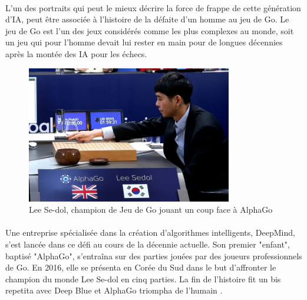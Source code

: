 \documentclass[10pt, french, a4paper]{article}
\begin{document}
\paragraph{}
L’un des portraits qui peut le mieux décrire la force de frappe de cette génération d’IA, peut être associée à l’histoire de la défaite d’un homme au jeu de Go. Le jeu de Go est l’un des jeux considérés comme les plus complexes au monde, soit un jeu qui pour l’homme devait lui rester en main pour de longues décennies après la montée des IA pour les échecs.


\begin{figure}[hbt!]
    \centering
    \includegraphics[width=0.8\textwidth]{images/alphago_lee_sedol.jpg}
    \caption{Lee Se-dol, champion de Jeu de Go jouant un coup face à AlphaGo \citep{noauthor_alphago_2017}}
    \label{fig:proba_super_ia}
\end{figure}

\paragraph{}
Une entreprise spécialisée dans la création d’algorithmes intelligents, DeepMind, s’est lancée dans ce défi au cours de la décennie actuelle. Son premier "enfant", baptisé "AlphaGo", s’entraîna sur des parties jouées par des joueurs professionnels de Go. En 2016, elle se présenta en Corée du Sud dans le but d’affronter le champion du monde Lee Se-dol en cinq parties. La fin de l’histoire fit un bis repetita avec Deep Blue et AlphaGo triompha de l’humain \citep{deepmind_alphago_2016}.
\end{document}
